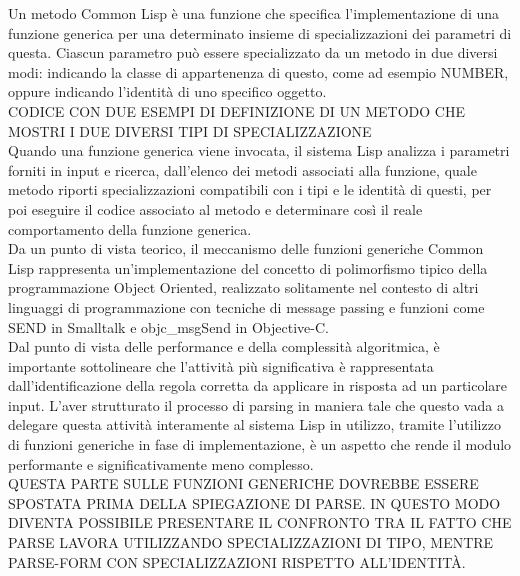 Un metodo Common Lisp è una funzione che specifica l’implementazione di una
funzione generica per una determinato insieme di specializzazioni dei
parametri di questa. Ciascun parametro può essere specializzato da un metodo
in due diversi modi: indicando la classe di appartenenza di questo, come ad
esempio NUMBER, oppure indicando l’identità di uno specifico oggetto.\\

CODICE CON DUE ESEMPI DI DEFINIZIONE DI UN METODO CHE MOSTRI I DUE DIVERSI
TIPI DI SPECIALIZZAZIONE\\

Quando una funzione generica viene invocata, il sistema Lisp analizza i
parametri forniti in input e ricerca, dall’elenco dei metodi associati alla
funzione, quale metodo riporti specializzazioni compatibili con i tipi e le
identità di questi, per poi eseguire il codice associato al metodo e
determinare così il reale comportamento della funzione generica.\\

Da un punto di vista teorico, il meccanismo delle funzioni generiche Common
Lisp rappresenta un’implementazione del concetto di polimorfismo tipico della
programmazione Object Oriented, realizzato solitamente nel contesto di altri
linguaggi di programmazione con tecniche di message passing e funzioni come
SEND in Smalltalk e objc_msgSend in Objective-C.\\

Dal punto di vista delle performance e della complessità algoritmica, è
importante sottolineare che l’attività più significativa è rappresentata
dall’identificazione della regola corretta da applicare in risposta ad un
particolare input. L’aver strutturato il processo di parsing in maniera tale
che questo vada a delegare questa attività interamente al sistema Lisp in
utilizzo, tramite l’utilizzo di funzioni generiche in fase di implementazione,
è un aspetto che rende il modulo performante e significativamente meno
complesso.\\

QUESTA PARTE SULLE FUNZIONI GENERICHE DOVREBBE ESSERE SPOSTATA PRIMA DELLA
SPIEGAZIONE DI PARSE. IN QUESTO MODO DIVENTA POSSIBILE PRESENTARE IL CONFRONTO
TRA IL FATTO CHE PARSE LAVORA UTILIZZANDO SPECIALIZZAZIONI DI TIPO, MENTRE
PARSE-FORM CON SPECIALIZZAZIONI RISPETTO ALL’IDENTITÀ.\\

